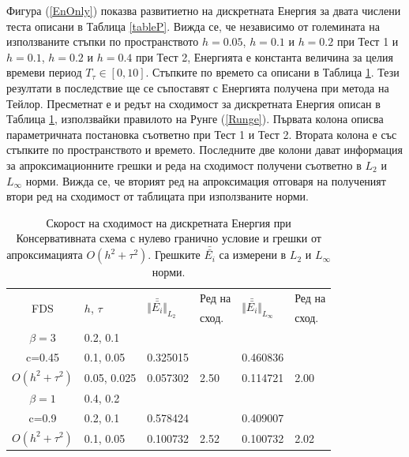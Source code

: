 \documentclass{article}
\newcommand{\rf}[1]{(\ref{#1})}
\theoremstyle{remark}
\begin{document}
Фигура \rf{EnOnly} показва развитиетно на дискретната Енергия за двата числени теста описани в Таблица \ref{tableP}. Вижда се, че независимо от големината на използваните стъпки по пространството $h = 0.05$, $h = 0.1$ и $h = 0.2$ при Тест 1 и $h = 0.1$, $h = 0.2$ и $h = 0.4$ при Тест 2, Енергията е константа величина за целия времеви период $T_{\tau} \in [0, 10]$. Стъпките по времето са описани в Таблица \ref{tableD}. Тези резултати в последствие ще се съпоставят с Енергията получена при метода на Тейлор. Пресметнат е и редът на сходимост за дискретната Енергия описан в Таблица \ref{tableD}, използвайки правилото на Рунге \rf{Runge}. Първата колона описва параметричната постановка съответно при Тест 1 и Тест 2. Втората колона е със стъпките по пространството и времето. Последните две колони дават информация за апроксимационните грешки и реда на сходимост получени съответно в $L_2$ и $L_\infty$ норми. Вижда се, че вторият ред на апроксимация отговаря на полученият втори ред на сходимост от таблицата при използваните норми.
\begin{table}[ht]
\centering
\small
		\begin{tabular}{||c|l|ll|ll||}
			\hline
			\hline
      \multirow{2  }{*}{FDS}        & \multirow{2  }{*}{$h$, $\tau$}  &  	\multirow{2  }{*}{ $\Vert \bar{\bar{ E_i}} \Vert_{L_2}$ }	&Ред на	& \multirow{2  }{*}{ $\Vert \bar{\bar{ E_i}} \Vert_{L_\infty}$ } 		&Ред на   \\
	                                        &                                                & 							 					&  сход. 	& 								       					& сход. \\
   			\hline 
					\hline 
  $\beta=3$                &0.2, 0.1         &                    &                &                  &                   \\
   c=0.45                     &0.1, 0.05         & 0.325015   &                & 0.460836  &                   \\
     $O(h^2 + \tau^ 2)$ &0.05, 0.025  & 0.057302   & 2.50       & 0.114721  & 2.00   \\
	   \hline
			\hline 
       $\beta=1$           & 0.4, 0.2       &                   &           &                 &   \\
                  c=0.9       & 0.2, 0.1        & 0.578424   &          &0.409007  &   \\
  $O(h^2+ \tau^2)$  & 0.1, 0.05       & 0.100732   & 2.52  &0.100732  & 2.02  \\
	   \hline
			\hline 
		\end{tabular}
		\caption{Скорост на сходимост на дискретната Енергия при Консервативната схема с нулево гранично условие и грешки от апроксимацията $O(h^{2} + \tau^2 )$. Грешките $\bar{\bar{ E_i}}$ са измерени в $L_2$ и $L_\infty$ норми.}
\label{tableD}
\end{table}
\end{document}
